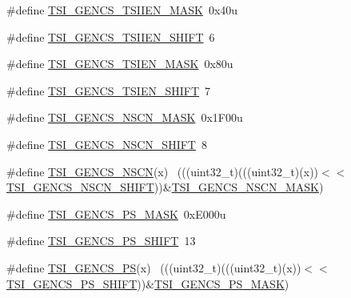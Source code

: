\begin{DoxyCompactItemize}
\item 
\#define \hyperlink{group___t_s_i___register___masks_gab0858eebe3e9aafb69f43b4547681aa4}{T\+S\+I\+\_\+\+G\+E\+N\+C\+S\+\_\+\+T\+S\+I\+I\+E\+N\+\_\+\+M\+A\+SK}~0x40u
\item 
\#define \hyperlink{group___t_s_i___register___masks_ga484d481ffbcbe5d9199e848658c66cc7}{T\+S\+I\+\_\+\+G\+E\+N\+C\+S\+\_\+\+T\+S\+I\+I\+E\+N\+\_\+\+S\+H\+I\+FT}~6
\item 
\#define \hyperlink{group___t_s_i___register___masks_gafa7ce02781bc0e3d369d9a00a77b480f}{T\+S\+I\+\_\+\+G\+E\+N\+C\+S\+\_\+\+T\+S\+I\+E\+N\+\_\+\+M\+A\+SK}~0x80u
\item 
\#define \hyperlink{group___t_s_i___register___masks_ga503402dbca8eec965cad561df32e7cf5}{T\+S\+I\+\_\+\+G\+E\+N\+C\+S\+\_\+\+T\+S\+I\+E\+N\+\_\+\+S\+H\+I\+FT}~7
\item 
\#define \hyperlink{group___t_s_i___register___masks_ga3a420e0ae200374eca1a185b535cc0ba}{T\+S\+I\+\_\+\+G\+E\+N\+C\+S\+\_\+\+N\+S\+C\+N\+\_\+\+M\+A\+SK}~0x1\+F00u
\item 
\#define \hyperlink{group___t_s_i___register___masks_gab90732bc69449d59a0fc0f3c208caf21}{T\+S\+I\+\_\+\+G\+E\+N\+C\+S\+\_\+\+N\+S\+C\+N\+\_\+\+S\+H\+I\+FT}~8
\item 
\#define \hyperlink{group___t_s_i___register___masks_ga88b69a519adf7824cdb68192fb98b684}{T\+S\+I\+\_\+\+G\+E\+N\+C\+S\+\_\+\+N\+S\+CN}(x)                                            ~(((uint32\+\_\+t)(((uint32\+\_\+t)(x))$<$$<$\hyperlink{group___t_s_i___register___masks_gab90732bc69449d59a0fc0f3c208caf21}{T\+S\+I\+\_\+\+G\+E\+N\+C\+S\+\_\+\+N\+S\+C\+N\+\_\+\+S\+H\+I\+FT}))\&\hyperlink{group___t_s_i___register___masks_ga3a420e0ae200374eca1a185b535cc0ba}{T\+S\+I\+\_\+\+G\+E\+N\+C\+S\+\_\+\+N\+S\+C\+N\+\_\+\+M\+A\+SK})
\item 
\#define \hyperlink{group___t_s_i___register___masks_ga3c608c250c31872d206e9c18eea97799}{T\+S\+I\+\_\+\+G\+E\+N\+C\+S\+\_\+\+P\+S\+\_\+\+M\+A\+SK}~0x\+E000u
\item 
\#define \hyperlink{group___t_s_i___register___masks_gaae1f3b081a9c92fefe10bd3ec1f40734}{T\+S\+I\+\_\+\+G\+E\+N\+C\+S\+\_\+\+P\+S\+\_\+\+S\+H\+I\+FT}~13
\item 
\#define \hyperlink{group___t_s_i___register___masks_ga6edb5dbc41896c6d33fd1395d9e1a17d}{T\+S\+I\+\_\+\+G\+E\+N\+C\+S\+\_\+\+PS}(x)                                                ~(((uint32\+\_\+t)(((uint32\+\_\+t)(x))$<$$<$\hyperlink{group___t_s_i___register___masks_gaae1f3b081a9c92fefe10bd3ec1f40734}{T\+S\+I\+\_\+\+G\+E\+N\+C\+S\+\_\+\+P\+S\+\_\+\+S\+H\+I\+FT}))\&\hyperlink{group___t_s_i___register___masks_ga3c608c250c31872d206e9c18eea97799}{T\+S\+I\+\_\+\+G\+E\+N\+C\+S\+\_\+\+P\+S\+\_\+\+M\+A\+SK})

\end{DoxyCompactItemize}
